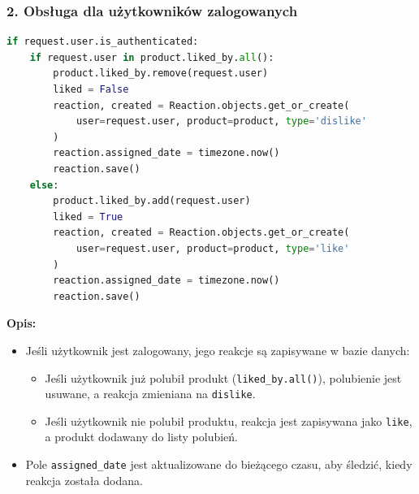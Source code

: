 \documentclass[12pt,a4paper,oneside]{article}
\theoremstyle{definition}
\numberwithin{equation}{section}
\begin{document}
\subsubsection*{2. Obsługa dla użytkowników zalogowanych}
\begin{lstlisting}[language=Python, caption=Fragment kodu: Obsługa dla użytkowników zalogowanych]
if request.user.is_authenticated:
    if request.user in product.liked_by.all():
        product.liked_by.remove(request.user)
        liked = False
        reaction, created = Reaction.objects.get_or_create(
            user=request.user, product=product, type='dislike'
        )
        reaction.assigned_date = timezone.now()
        reaction.save()
    else:
        product.liked_by.add(request.user)
        liked = True
        reaction, created = Reaction.objects.get_or_create(
            user=request.user, product=product, type='like'
        )
        reaction.assigned_date = timezone.now()
        reaction.save()
\end{lstlisting}
\textbf{Opis:}
\begin{itemize}
    \item Jeśli użytkownik jest zalogowany, jego reakcje są zapisywane w bazie danych:
    \begin{itemize}
        \item Jeśli użytkownik już polubił produkt (\texttt{liked\_by.all()}), polubienie jest usuwane, a reakcja zmieniana na \texttt{dislike}.
        \item Jeśli użytkownik nie polubił produktu, reakcja jest zapisywana jako \texttt{like}, a produkt dodawany do listy polubień.
    \end{itemize}
    \item Pole \texttt{assigned\_date} jest aktualizowane do bieżącego czasu, aby śledzić, kiedy reakcja została dodana.
\end{itemize}
\end{document}

